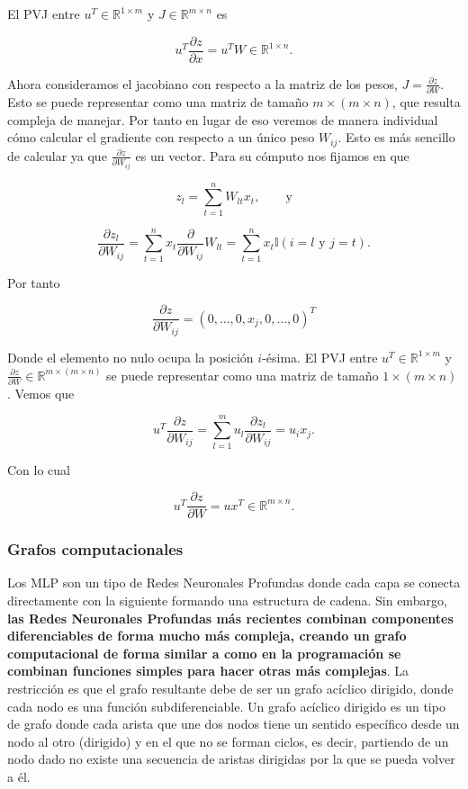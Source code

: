 

El PVJ entre $u^T \in \mathbb{R}^{1 \times m}$ y $J \in \mathbb{R}^{m \times n}$ es

$$u^T \frac{\partial z}{\partial x} = u^T W \in \mathbb{R}^{1 \times n}.$$

Ahora consideramos el jacobiano con respecto a la matriz de los pesos, $J=\frac{\partial z}{\partial W}$. Esto se puede representar como una matriz de tamaño $m \times (m \times n)$, que resulta compleja de manejar. Por tanto en lugar de eso veremos de manera individual cómo calcular el gradiente con respecto a un único peso $W_{ij}$. Esto es más sencillo de calcular ya que $\frac{\partial z}{\partial W_{ij}}$ es un vector. Para su cómputo nos fijamos en que 

$$z_l = \sum_{t=1}^n W_{lt}x_t, \qquad \textrm{y}$$

$$\frac{\partial z_l}{\partial W_{ij}} = \sum_{t=1}^n x_t \frac{\partial}{\partial W_{ij}} W_{lt} = \sum_{t=1}^n x_t \mathbb{I}(i=l \textrm{ y } j=t) .$$

Por tanto

$$\frac{\partial z}{\partial W_{ij}} = \left ( 0, \ldots, 0, x_j,  0, \ldots, 0 \right )^T$$

Donde el elemento no nulo ocupa la posición $i$-ésima. El PVJ entre $u^T \in \mathbb{R}^{1 \times m}$ y $\frac{\partial z}{\partial W} \in \mathbb{R}^{m \times ( m \times n)}$ se puede representar como una matriz de tamaño $1 \times (m \times n)$. Vemos que 

$$u^T \frac{\partial z}{\partial W_{ij}}= \sum_{l=1}^m u_l \frac{\partial z_l}{\partial W_{ij}} = u_i x_j.$$

Con lo cual

$$ u^T \frac{\partial z}{\partial W}  = ux^T \in \mathbb{R}^{m \times n}.$$



\subsubsection{Grafos computacionales}

Los MLP son un tipo de Redes Neuronales Profundas donde cada capa se conecta directamente con la siguiente formando una estructura de cadena. Sin embargo,\textbf{ las Redes Neuronales Profundas más recientes combinan componentes diferenciables de forma mucho más compleja, creando un grafo computacional de forma similar a como en la programación se combinan funciones simples para hacer otras más complejas}. La restricción es que el grafo resultante debe de ser un grafo acíclico dirigido, donde cada nodo es una función subdiferenciable. Un grafo acíclico dirigido es un tipo de grafo donde cada arista que une dos nodos tiene un sentido específico desde un nodo al otro (dirigido) y en el que no se forman ciclos, es decir, partiendo de un nodo dado no existe una secuencia de aristas dirigidas por la que se pueda volver a él.



